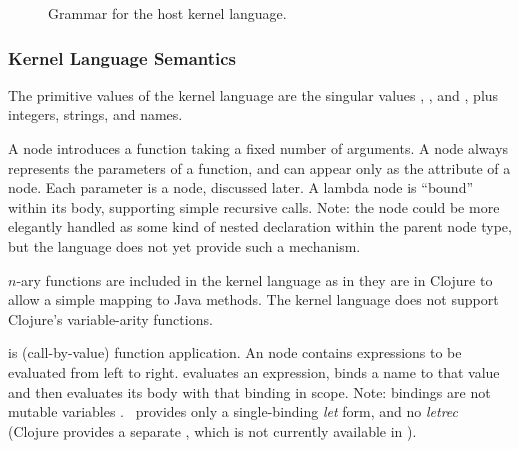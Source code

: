 \begin{figure}








  \caption{\label{fig-kernel} Grammar for the host kernel language.}
\end{figure}

\subsubsection{Kernel Language Semantics}
The primitive values of the kernel language are the singular values , , and , plus integers, strings, and names.

A  node introduces a function taking a fixed number of arguments. A  node always represents the parameters of a function, and can appear only as the  attribute of a  node. Each parameter is a  node, discussed later. A lambda node is ``bound'' within its body, supporting simple recursive calls. %
Note: the  node could be more elegantly handled as some kind of nested declaration within the parent node type, but the  language does not yet provide such a mechanism.

$n$-ary functions are included in the kernel language as in they are in Clojure to allow a simple mapping to Java methods. The kernel language does not support Clojure's variable-arity functions.

 is (call-by-value) function application. An  node contains expressions to be evaluated from left to right.
 evaluates an expression, binds a name to that value and then evaluates its body with that binding in scope. Note: bindings are not mutable variables . \Meta\ provides only a single-binding \emph{let} form, and no \emph{letrec} (Clojure provides a separate , which is not currently available in \Meta).

